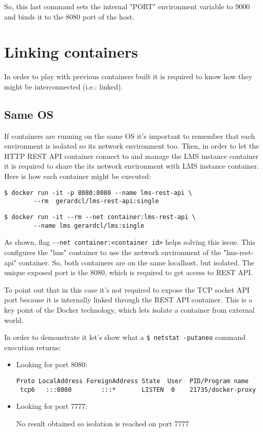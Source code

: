 So, this last command sets the internal "PORT" environment variable to 9000 and binds it to the 8080 port of the host.

\section{Linking containers}

In order to play with previous containers built it is required to know how they might be interconnected (i.e.: linked).

\subsection{Same OS}

If containers are running on the same OS it's important to remember that each environment is isolated so its network environment too. Then, in order to let the HTTP REST API container connect to and manage the LMS instance container it is required to share the its network environment with LMS instance container. Here is how each container might be executed:

\begin{verbatim}
$ docker run -it -p 8080:8080 --name lms-rest-api \
		--rm  gerardcl/lms-rest-api:single
\end{verbatim}
\begin{verbatim}
$ docker run -it --rm --net container:lms-rest-api \
		--name lms gerardcl/lms:single
\end{verbatim}

As shown, flag \verb|--net container:<container id>| helps solving this issue. This configures the "lms" container to use the network environment of the "lms-rest-api" container. So, both containers are on the same localhost, but isolated. The unique exposed port is the 8080, which is required to get access to REST API.

To point out that in this case it's not required to expose the TCP socket API port because it is internally linked through the REST API container. This is a key point of the Docker technology, which lets isolate a container from external world. 

In order to demonstrate it let's show what a \verb|$ netstat -putaneo| command  execution returns:
\begin{itemize}
\item Looking for port 8080: \hfill

\begin{verbatim}
Proto LocalAddress ForeignAddress State  User  PID/Program name 
 tcp6   :::8080        :::*       LISTEN  0    21735/docker-proxy
\end{verbatim}
\item Looking for port 7777: \hfill

No result obtained so isolation is reached on port 7777
\end{itemize}

